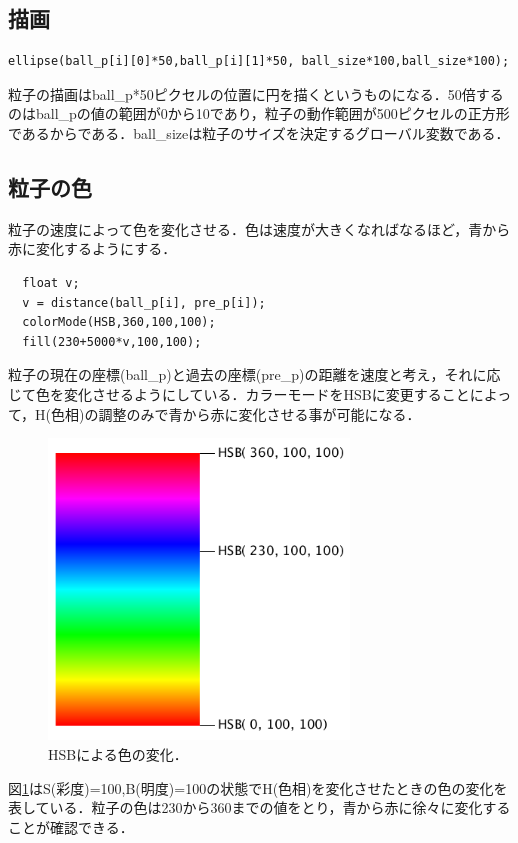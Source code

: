\subsection{描画}
\begin{screen}
{\small
\begin{verbatim}
ellipse(ball_p[i][0]*50,ball_p[i][1]*50, ball_size*100,ball_size*100);
\end{verbatim}}
\end{screen}
粒子の描画はball\_p*50ピクセルの位置に円を描くというものになる．50倍するのはball\_pの値の範囲が0から10であり，粒子の動作範囲が500ピクセルの正方形であるからである．ball\_sizeは粒子のサイズを決定するグローバル変数である．

\subsection{粒子の色}
粒子の速度によって色を変化させる．色は速度が大きくなればなるほど，青から赤に変化するようにする．
\begin{screen}
{\small
\begin{verbatim}
  float v;
  v = distance(ball_p[i], pre_p[i]);
  colorMode(HSB,360,100,100);
  fill(230+5000*v,100,100); 
\end{verbatim}}
\end{screen}
粒子の現在の座標(ball\_p)と過去の座標(pre\_p)の距離を速度と考え，それに応じて色を変化させるようにしている．カラーモードをHSBに変更することによって，H(色相)の調整のみで青から赤に変化させる事が可能になる．

\begin{figure}[htbp]
 \begin{center}
  \includegraphics[width=80mm]{../implement/color_HSB.png}
 \end{center}
 \caption{HSBによる色の変化．}
 \label{fig:hsb}
\end{figure}
図\ref{fig:hsb}はS(彩度)=100,B(明度)=100の状態でH(色相)を変化させたときの色の変化を表している．粒子の色は230から360までの値をとり，青から赤に徐々に変化することが確認できる．

